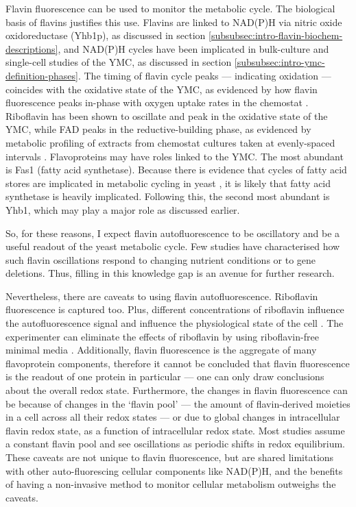 Flavin fluorescence can be used to monitor the metabolic cycle.
The biological basis of flavins justifies this use.
Flavins are linked to NAD(P)H via nitric oxide oxidoreductase (Yhb1p), as discussed in section \ref{subsubsec:intro-flavin-biochem-descriptions}, and NAD(P)H cycles have been implicated in bulk-culture \parencite{tuLogicYeastMetabolic2005} %
and single-cell \parencite{papagiannakisAutonomousMetabolicOscillations2017} studies of the YMC, as discussed in section \ref{subsubsec:intro-ymc-definition-phases}.
The timing of flavin cycle peaks --- indicating oxidation --- coincides with the oxidative state of the YMC, as evidenced by how flavin fluorescence peaks in-phase with oxygen uptake rates in the chemostat \parencite{murrayRedoxRegulationRespiring2011,sasidharanTimeStructureYeastMetabolism2012}.
Riboflavin has been shown to oscillate and peak in the oxidative state of the YMC, while FAD peaks in the reductive-building phase, as evidenced by metabolic profiling of extracts from chemostat cultures taken at evenly-spaced intervals \parencite{tuCyclicChangesMetabolic2007}.
Flavoproteins may have roles linked to the YMC.
The most abundant is Fas1 (fatty acid synthetase).
Because there is evidence that cycles of fatty acid stores are implicated in metabolic cycling in yeast \parencite{campbellBuildingBlocksAre2020}, it is likely that fatty acid synthetase is heavily implicated.
Following this, the second most abundant is Yhb1, which may play a major role as discussed earlier.

So, for these reasons, I expect flavin autofluorescence to be oscillatory and be a useful readout of the yeast metabolic cycle.
Few studies have characterised how such flavin oscillations respond to changing nutrient conditions or to gene deletions.
Thus, filling in this knowledge gap is an avenue for further research.

Nevertheless, there are caveats to using flavin autofluorescence.
Riboflavin fluorescence is captured too.
Plus, different concentrations of riboflavin influence the autofluorescence signal and influence the physiological state of the cell \parencite{maslankaAutofluorescenceYeastSaccharomyces2018}.
The experimenter can eliminate the effects of riboflavin by using riboflavin-free minimal media \parencite{verduynEffectBenzoicAcid1992}.
Additionally, flavin fluorescence is the aggregate of many flavoprotein components, therefore it cannot be concluded that flavin fluorescence is the readout of one protein in particular --- one can only draw conclusions about the overall redox state.
Furthermore, the changes in flavin fluorescence can be because of changes in the `flavin pool' --- the amount of flavin-derived moieties in a cell across all their redox states --- or due to global changes in intracellular flavin redox state, as a function of intracellular redox state.
Most studies assume a constant flavin pool and see oscillations as periodic shifts in redox equilibrium.
These caveats are not unique to flavin fluorescence, but are shared limitations with other auto-fluorescing cellular components like NAD(P)H, and the benefits of having a non-invasive method to monitor cellular metabolism outweighs the caveats.


